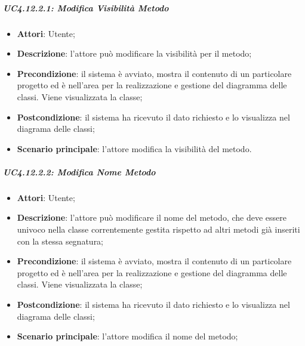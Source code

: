\subparagraph{UC4.12.2.1: Modifica Visibilità Metodo}
\label{UC4.12.2.1}
\begin{itemize}
	\item \textbf{Attori}: Utente;
	\item \textbf{Descrizione}: l'attore può modificare la visibilità per il metodo;
	\item \textbf{Precondizione}:  il sistema è avviato, mostra il contenuto di un particolare progetto ed è nell'area per la realizzazione e gestione del diagramma delle classi. Viene visualizzata la classe;
	\item \textbf{Postcondizione}: il sistema ha ricevuto il dato richiesto e lo visualizza nel diagrama delle classi;
	\item \textbf{Scenario principale}: l'attore modifica la visibilità del metodo.
\end{itemize}

\subparagraph{UC4.12.2.2: Modifica Nome Metodo}
\label{UC4.12.2.2}
\begin{itemize}
	\item \textbf{Attori}: Utente;
	\item \textbf{Descrizione}: l'attore può modificare il nome del metodo, che deve essere univoco nella classe correntemente gestita rispetto ad altri metodi già inseriti con la stessa segnatura;
	\item \textbf{Precondizione}: il sistema è avviato, mostra il contenuto di un particolare progetto ed è nell'area per la realizzazione e gestione del diagramma delle classi. Viene visualizzata la classe;
	\item \textbf{Postcondizione}: il sistema ha ricevuto il dato richiesto e lo visualizza nel diagrama delle classi;
	\item \textbf{Scenario principale}: l'attore modifica il nome del metodo;

\end{itemize}

